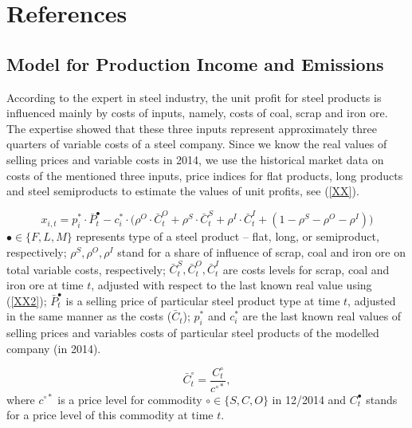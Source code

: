 \documentclass[3p,times]{elsarticle}
\begin{document}
\section*{References}



\appendix

\def\indep{\perp\hspace{-2mm}\perp}
\def\E{\mathbb{E}}
\def\var{\mathrm{var}}
\newtheorem{lemma}{Lemma}

\subsection{Model for Production Income and Emissions}

According to the expert in steel industry, the unit profit for steel products is influenced mainly by costs of inputs, namely, costs of coal, scrap and iron ore. The expertise showed that these three inputs represent approximately three quarters of variable costs of a steel company. Since we know the real values of selling prices and variable costs in 2014, we use the historical market data on costs of the mentioned three inputs, price indices for flat products, long products and steel semiproducts to estimate the values of unit profits, see (\ref{XX}).

\begin{equation}
x_{i,t}=p_i^* \cdot \bar{P}_t^{\bullet} - c_i^* \cdot \bigl(\rho^{O}\cdot\bar{C}_t^{O}+\rho^{S}\cdot\bar{C}_t^{S}+\rho^{I}\cdot\bar{C}_t^{I}+(1-\rho^{S}-\rho^{O}-\rho^{I})\bigr)
\label{XX}
\end{equation}
$\bullet\in\{F,L,M\}$ represents type of a steel product -- flat, long, or semiproduct, respectively; $\rho^S,\rho^O,\rho^I$ stand for a share of influence of scrap, coal and iron ore on total variable costs, respectively; $\bar{C}_t^{S},\bar{C}_t^{O},\bar{C}_t^{I}$ are costs levels for scrap, coal and iron ore at time $t$, adjusted with respect to the last known real value using (\ref{XX2}); $\bar{P}_t^{\bullet}$ is a selling price of particular steel product type at time $t$, adjusted in the same manner as the costs ($\bar{C}_t$); $p_i^*$ and $c_i^*$ are the last known real values of selling prices and variables costs of particular steel products of the modelled company (in 2014). 

\begin{equation}
\bar{C}_t^{\circ}=\frac{C_t^{\circ}}{c^{\circ *}},
\label{XX2}
\end{equation}
where $c^{\circ *}$ is a price level for commodity $\circ\in\{S,C,O\}$ in 12/2014 and $C_t^{\bullet}$ stands for a price level of this commodity at time $t$.
\end{document}
